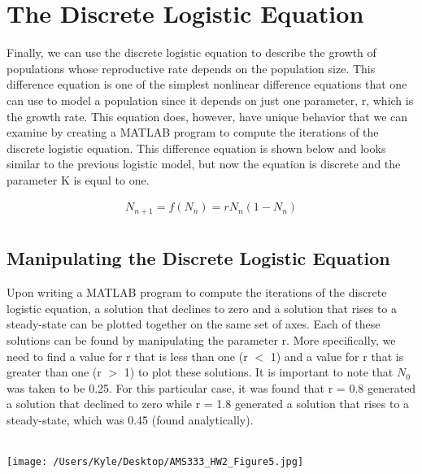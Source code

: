 \documentclass[12pt]{article}
\begin{document}
\section{The Discrete Logistic Equation}
Finally, we can use the discrete logistic equation to describe the growth of populations whose reproductive rate depends on the population size. This difference equation is one of the simplest nonlinear difference equations that one can use to model a population since it depends on just one parameter, r, which is the growth rate. This equation does, however, have unique behavior that we can examine by creating a MATLAB program to compute the iterations of the discrete logistic equation. This difference equation is shown below and looks similar to the previous logistic model, but now the equation is discrete and the parameter K is equal to one.

\begin{gather*}
N_{n+1} = f(N_n) = rN_n (1-N_n)\\
\end{gather*}


\subsection*{Manipulating the Discrete Logistic Equation}
Upon writing a MATLAB program to compute the iterations of the discrete logistic equation, a solution that declines to zero and a solution that rises to a steady-state can be plotted together on the same set of axes. Each of these solutions can be found by manipulating the parameter r. More specifically, we need to find a value for r that is less than one (r $<$ 1) and a value for r that is greater than one (r $>$ 1) to plot these solutions. It is important to note that $N_0$ was taken to be 0.25. For this particular case, it was found that r = 0.8 generated a solution that declined to zero while r = 1.8 generated a solution that rises to a steady-state, which was 0.45 (found analytically). \\\


\begin{center}
   \texttt{[image: /Users/Kyle/Desktop/AMS333\_HW2\_Figure5.jpg]}
\end{center}\
\end{document}
